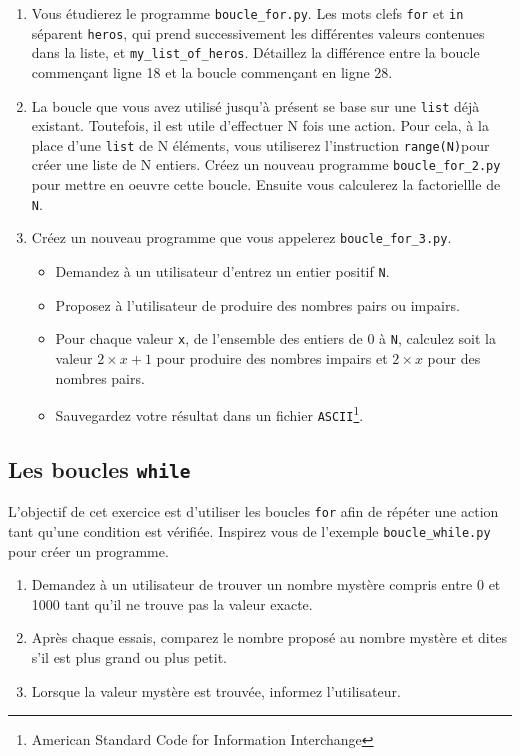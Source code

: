 \begin{enumerate}
\item Vous étudierez le programme \texttt{boucle\_for.py}.
  Les mots clefs \texttt{for} et \texttt{in} séparent \texttt{heros}, qui prend successivement
  les différentes valeurs contenues dans la liste, et \texttt{my\_list\_of\_heros}.
  Détaillez la différence entre la boucle commençant ligne 18 et la boucle commençant en ligne 28.

\item La boucle que vous avez utilisé jusqu'à présent se base sur une \texttt{list} déjà existant.
  Toutefois, il est utile d'effectuer N fois une action. Pour cela, à la place d'une \texttt{list} de N
  éléments, vous utiliserez l'instruction \texttt{range(N)}pour créer une liste de N entiers.
  Créez un nouveau programme \texttt{boucle\_for\_2.py} pour mettre en oeuvre cette boucle.
  Ensuite vous calculerez la factoriellle de \texttt{N}.

\item Créez un nouveau programme que vous appelerez \texttt{boucle\_for\_3.py}.
  \begin{itemize}
  \item Demandez à un utilisateur d'entrez un entier positif \texttt{N}.
  \item Proposez à l'utilisateur de produire des nombres pairs ou impairs.
  \item Pour chaque valeur \texttt{x}, de l'ensemble des entiers de 0 à \texttt{N},
    calculez soit la valeur $2\times x+1$ pour produire des nombres impairs et $2\times x$ pour des nombres pairs.
  \item Sauvegardez votre résultat dans un fichier \texttt{ASCII}\footnote{American Standard Code for Information Interchange}.
  \end{itemize}

\end{enumerate}




\subsection{Les boucles \texttt{while}}

L'objectif de cet exercice est d'utiliser les boucles \texttt{for} afin de répéter une action
tant qu'une condition est vérifiée.
Inspirez vous de l'exemple \texttt{boucle\_while.py} pour créer un programme.

\begin{enumerate}
\item Demandez à un utilisateur de trouver un nombre mystère compris entre 0 et 1000 tant qu'il ne trouve pas
  la valeur exacte.

\item Après chaque essais, comparez le nombre proposé au nombre mystère et dites s'il est plus grand ou plus petit.

\item Lorsque la valeur mystère est trouvée, informez l'utilisateur.

\end{enumerate}



